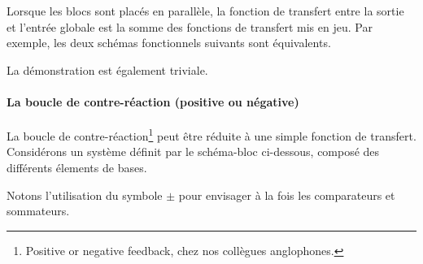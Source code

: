 Lorsque les blocs sont placés en parallèle, la fonction de transfert 
entre la sortie et l'entrée globale est la somme des fonctions de transfert 
mis en jeu. Par exemple, les deux schémas fonctionnels suivants 
sont équivalents.

\begin{center}
\end{center}

\begin{center}
\end{center}

La démonstration est également triviale.

\paragraph{La boucle de contre-réaction (positive ou négative)
          \label{sec-boucle}}

La boucle de contre-réaction\footnote{\og Positive or negative feedback\fg, 
chez nos collègues anglophones.} peut être réduite à une simple fonction 
de transfert. Considérons un système définit par le schéma-bloc ci-dessous, 
composé des différents élements de bases.

\begin{center}
\end{center}
Notons l'utilisation du symbole $\pm$ pour envisager à la fois les 
comparateurs et sommateurs.

